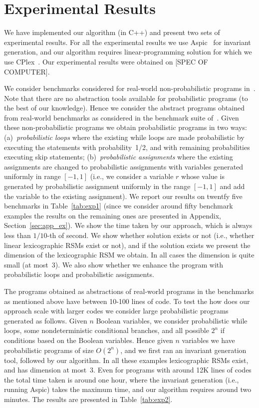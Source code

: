 
\section{Experimental Results}
We have implemented our algorithm (in C++) and present two sets of experimental results.
For all the experimental results we use Aspic~\cite{} for invariant generation, 
and our algorithm requires linear-programming solution for which we use CPlex~\cite{}.
Our experimental results were obtained on [SPEC OF COMPUTER].


\smallskip{}
We consider benchmarks considered for real-world non-probabilistic programs 
in~\cite{ADFG10:lexicographic}.
Note that there are no abstraction tools available for probabilistic programs (to the
best of our knowledge). 
Hence we consider the abstract programs obtained from real-world benchmarks as 
considered in the benchmark suite of~\cite{ADFG10:lexicographic}.
Given these non-probabilistic programs we obtain probabilistic programs in two ways:
(a)~{\em probabilistic loops} where the existing while loops are made probabilistic 
by executing the statements with probability~1/2, and with remaining probabilities 
executing skip statements;
(b)~{\em probabilistic assignments} where the existing assignments are changed to 
probabilistic assignments with variables generated uniformly in range $[-1,1]$ 
(i.e., we consider a variable $r$ whose value is generated by probabilistic 
assignment uniformly in the range $[-1,1]$ and add the variable to the existing 
assignment).
We report our results on twentfy five benchmarks in Table~\ref{tab:exp1} (since we consider around 
fifty benchmark examples the results on the remaining ones are presented in Appendix, Section~\ref{sec:app_ex}).
We show the time taken by our approach, which is always less than $1/10$-th of second.
We show whether solution exists or not (i.e., whether linear lexicographic RSMs exist
or not), and if the solution exists we present the dimension of the lexicographic RSM
we obtain. In all cases the dimension is quite small (at most~3). 
We also show whether we enhance the program with probabilistic loops and probabilistic assignments.


\smallskip{} 
The programs obtained as abstractions of real-world programs in the benchmarks 
as mentioned above have between 10-100 lines of code. 
To test the how does our approach scale with larger codes we consider large
probabilistic programs generated as follows.
Given $n$ Boolean variables, we consider probabilistic while loops,
some nondeterministic conditional branches, and all possible $2^n$ if conditions
based on the Boolean variables. 
Hence given $n$ variables we have probabilistic programs of size $O(2^n)$, and 
we first ran an invariant generation tool, followed by our algorithm.
In all these examples lexicographic RSMs exist, and has dimension at most~3.
Even for programs with around 12K lines of codes the total time taken is around 
one hour, where the invariant generation (i.e., running Aspic) takes the maximum time, 
and our algorithm requires around two minutes.
The results are presented in Table~\ref{tab:exp2}.





